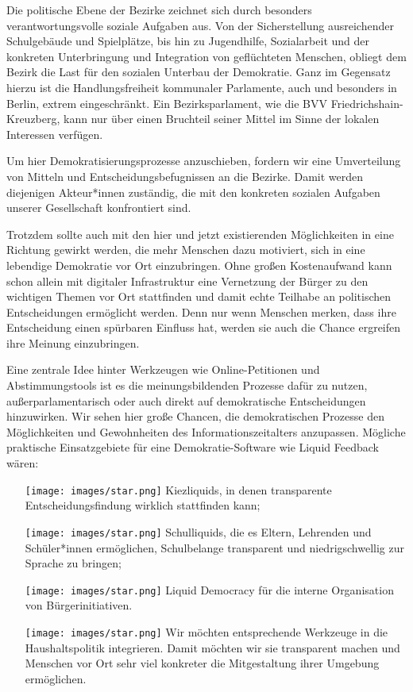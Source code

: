 \documentclass[a4paper,10pt]{article}
\begin{document}
Die politische Ebene der Bezirke zeichnet sich durch besonders
verantwortungsvolle soziale Aufgaben aus. Von der Sicherstellung
ausreichender Schulgebäude und Spielplätze, bis hin zu Jugendhilfe,
Sozialarbeit und der konkreten Unterbringung und Integration von
geflüchteten Menschen, obliegt dem Bezirk die Last für den sozialen
Unterbau der Demokratie. Ganz im Gegensatz hierzu ist die
Handlungsfreiheit kommunaler Parlamente, auch und besonders in Berlin,
extrem eingeschränkt. Ein Bezirksparlament, wie die BVV
Friedrichshain-Kreuzberg, kann nur über einen Bruchteil seiner Mittel im
Sinne der lokalen Interessen verfügen.

Um hier Demokratisierungsprozesse anzuschieben, fordern wir eine
Umverteilung von Mitteln und Entscheidungsbefugnissen an die Bezirke.
Damit werden diejenigen Akteur*innen zuständig, die mit den konkreten
sozialen Aufgaben unserer Gesellschaft konfrontiert sind.

Trotzdem sollte auch mit den hier und jetzt existierenden Möglichkeiten
in eine Richtung gewirkt werden, die mehr Menschen dazu motiviert, sich
in eine lebendige Demokratie vor Ort einzubringen. Ohne großen
Kostenaufwand kann schon allein mit digitaler Infrastruktur eine
Vernetzung der Bürger zu den wichtigen Themen vor Ort stattfinden und
damit echte Teilhabe an politischen Entscheidungen ermöglicht werden.
Denn nur wenn Menschen merken, dass ihre Entscheidung einen spürbaren
Einfluss hat, werden sie auch die Chance ergreifen ihre Meinung
einzubringen.

Eine zentrale Idee hinter Werkzeugen wie Online-Petitionen und
Abstimmungstools ist es die meinungsbildenden Prozesse dafür zu nutzen,
außerparlamentarisch oder auch direkt auf demokratische Entscheidungen
hinzuwirken. Wir sehen hier große Chancen, die demokratischen Prozesse
den Möglichkeiten und Gewohnheiten des Informationszeitalters
anzupassen. Mögliche praktische Einsatzgebiete für eine
Demokratie-Software wie Liquid Feedback wären:

\begin{itemize}
\itemsep1pt\parskip0pt
\item[\texttt{[image: images/star.png]}]
  Kiezliquids, in denen transparente Entscheidungsfindung wirklich
  stattfinden kann;
\item[\texttt{[image: images/star.png]}]
  Schulliquids, die es Eltern, Lehrenden und Schüler*innen ermöglichen,
  Schulbelange transparent und niedrigschwellig zur Sprache zu bringen;
\item[\texttt{[image: images/star.png]}]
  Liquid Democracy für die interne Organisation von Bürgerinitiativen.
\item[\texttt{[image: images/star.png]}]
  Wir möchten entsprechende Werkzeuge in die Haushaltspolitik
  integrieren. Damit möchten wir sie transparent machen und Menschen vor
  Ort sehr viel konkreter die Mitgestaltung ihrer Umgebung ermöglichen.
\end{itemize}
\end{document}
